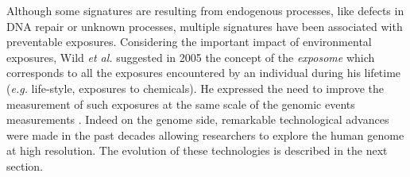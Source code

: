 Although some signatures are resulting from endogenous processes, like defects in \gls*{DNA} repair or unknown processes, multiple signatures have been associated with preventable exposures. %
Considering the important impact of environmental exposures, Wild \textit{et al.} suggested in 2005 the concept of the \textit{exposome} which corresponds to all the exposures encountered by an individual during his lifetime (\textit{e.g.} life-style, exposures to chemicals). He expressed the need to improve the measurement of such exposures at the same scale of the genomic events measurements \cite{Wild2005}. %
Indeed on the genome side, remarkable technological advances were made in the past decades allowing researchers to explore the human genome at high resolution. The evolution of these technologies is described in the next section.


\let\clearpage\relax